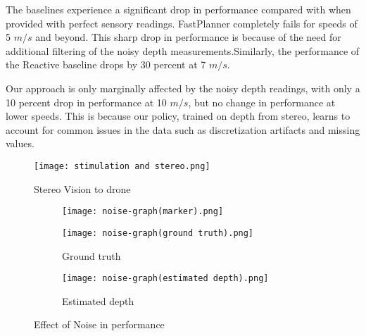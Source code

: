 The baselines experience a significant drop in performance
compared with when provided with perfect sensory readings. FastPlanner \cite{fastPlanner} completely fails for speeds of 5 $m/s$ and beyond. This sharp
drop in performance is because of the need for additional filtering of the noisy depth measurements.Similarly, the performance of the Reactive baseline
drops by 30 percent at 7 $m/s$.

Our approach
is only marginally affected by the noisy depth readings, with only a
10 percent drop in performance at 10 $m/s$, but no change in performance at
lower speeds. This is because our policy, trained on depth from stereo,
learns to account for common issues in the data such as discretization
artifacts and missing values.

\begin{figure}[!h]
	\centering
	\texttt{[image: stimulation and stereo.png]}
	\caption{Stereo Vision to drone}
	\label{fig:sterio-vision}
\end{figure}

\begin{figure}[!h]
	\centering
	\begin{subfigure}[b]{0.75\textwidth}
		\texttt{[image: noise-graph(marker).png]}
	\end{subfigure}
	\begin{subfigure}[b]{0.48\textwidth}
		\texttt{[image: noise-graph(ground truth).png]}
		\caption{Ground truth}
	\end{subfigure}
	\begin{subfigure}[b]{0.48\textwidth}
		\texttt{[image: noise-graph(estimated depth).png]}
		\caption{Estimated depth}
	\end{subfigure}
	\caption{Effect of Noise in performance}
	\label{fig:noise-graph}
\end{figure}
